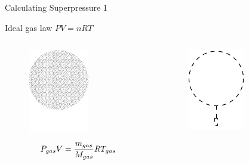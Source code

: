 \documentclass{beamer}
\begin{document}
\begin{frame}{Calculating Superpressure 1}

  Ideal gas law $PV = nRT$

  \begin{columns}
    \begin{column}{0.5\textwidth}
      \begin{figure}[!ht]
        \centering
        \includegraphics[width=0.6\textwidth]{circle_gas.png}
      \end{figure}

      \[
        P_{gas}V = {m_{gas}\over{M_{gas}}} R T_{gas}
      \]
    \end{column}
    \begin{column}{0.5\textwidth}
      \begin{figure}[!ht]
        \centering
        \includegraphics[width=0.6\textwidth]{circle_air_displaced.png}
      \end{figure}


\end{column}
\end{columns}
\end{frame}
\end{document}
